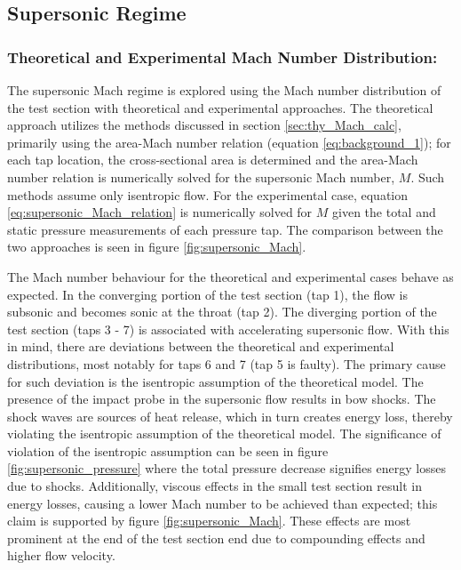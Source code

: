 \documentclass[runningheads]{llncs}
\begin{document}
\subsection{Supersonic Regime}


\subsubsection{Theoretical and Experimental Mach Number Distribution:}

\noindent
The supersonic Mach regime is explored using the Mach number distribution of the test section with theoretical and experimental approaches. The theoretical approach utilizes the methods discussed in section \ref{sec:thy_Mach_calc}, primarily using the area-Mach number relation (equation \ref{eq:background_1}); for each tap location, the cross-sectional area is determined and the area-Mach number relation is numerically solved for the supersonic Mach number, $M$. Such methods assume only isentropic flow. For the experimental case, equation \ref{eq:supersonic_Mach_relation} is numerically solved for $M$ given the total and static pressure measurements of each pressure tap. The comparison between the two approaches is seen in figure \ref{fig:supersonic_Mach}.\newline

\noindent
The Mach number behaviour for the theoretical and experimental cases behave as expected. In the converging portion of the test section (tap 1), the flow is subsonic and becomes sonic at the throat (tap 2). The diverging portion of the test section (taps 3 - 7) is associated with accelerating supersonic flow. With this in mind, there are deviations between the theoretical and experimental distributions, most notably for taps 6 and 7 (tap 5 is faulty). The primary cause for such deviation is the isentropic assumption of the theoretical model. The presence of the impact probe in the supersonic flow results in bow shocks. The shock waves are sources of heat release, which in turn creates energy loss, thereby violating the isentropic assumption of the theoretical model. The significance of violation of the isentropic assumption can be seen in figure \ref{fig:supersonic_pressure} where the total pressure decrease signifies energy losses due to shocks. Additionally, viscous effects in the small test section result in energy losses, causing a lower Mach number to be achieved than expected; this claim is supported by figure \ref{fig:supersonic_Mach}. These effects are most prominent at the end of the test section end due to compounding effects and higher flow velocity.
\end{document}
